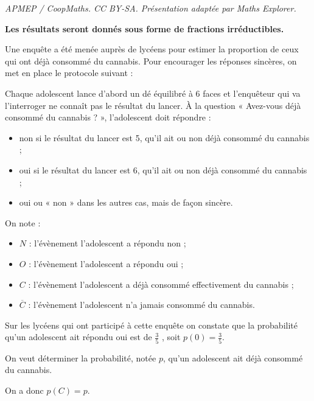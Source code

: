 \documentclass[10pt]{article}
\begin{document}
\noindent\textit{APMEP / CoopMaths. CC BY-SA. Présentation adaptée par Maths Explorer.}\par\medskip
\medskip

\textbf{Les résultats seront donnés sous forme de fractions irréductibles.}

Une enquête a été menée auprès de lycéens pour estimer la proportion de ceux qui ont déjà consommé du cannabis. Pour encourager les réponses sincères, on met en place le protocole suivant :

Chaque adolescent lance d’abord un dé équilibré à 6 faces et l’enquêteur qui va l’interroger ne connaît pas le résultat du lancer. À la question « Avez-vous déjà consommé du cannabis ? », l’adolescent doit répondre :

\begin{itemize}
\item [\textbullet] \og non \fg{} si le résultat du lancer est 5, qu’il ait ou non déjà consommé du cannabis ;
\item [\textbullet] \og oui \fg{} si le résultat du lancer est 6, qu’il ait ou non déjà consommé du cannabis ;
\item [\textbullet] \og oui \fg{} ou « non » dans les autres cas, mais de façon sincère.
\end{itemize}

On note :

\begin{itemize}
\item [\textbullet] $N$ : l’évènement l’adolescent a répondu \og non \fg{} ;
\item [\textbullet] $O$ : l’évènement l’adolescent a répondu \og oui \fg{} ;
\item [\textbullet] $C$ : l’évènement l’adolescent a déjà consommé effectivement du cannabis ;
\item [\textbullet] $\overline{C}$ : l’évènement l’adolescent n'a jamais consommé du cannabis.
\end{itemize} 

Sur les lycéens qui ont participé à cette enquête on constate que la probabilité qu’un adolescent ait répondu \og oui \fg{} est de $\frac{3}{5}$ , soit $p(0) = \frac{3}{5}$.

On veut déterminer la probabilité, notée $p$, qu’un adolescent ait déjà consommé du cannabis.

On a donc $p(C)= p$.

\medskip
\end{document}
